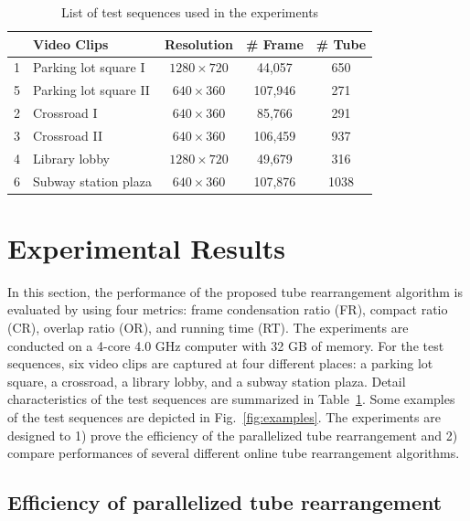 \documentclass[11pt]{hyu_thesis}
\begin{document}
\begin{table}
	\small
	\begin{center}
		\begin{tabular}{c|l|c|c|c|}
			\cline{2-5}
			& Video Clips & Resolution & \# Frame & \# Tube\\
			\hline
			\multicolumn{1}{|c|}{1} & Parking lot square I & $1280 \times 720$ & 44,057 & 650\\
			\hline
			\multicolumn{1}{|c|}{5} & Parking lot square II & $640 \times 360$ & 107,946 & 271\\
			\hline
			\multicolumn{1}{|c|}{2} & Crossroad I & $640 \times 360$ & 85,766 & 291\\
			\hline
			\multicolumn{1}{|c|}{3} & Crossroad II & $640 \times 360$ & 106,459 & 937\\
			\hline
			\multicolumn{1}{|c|}{4} & Library lobby & $1280 \times 720$ & 49,679 & 316\\
			\hline
			\multicolumn{1}{|c|}{6} & Subway station plaza & $640 \times 360$ & 107,876 & 1038\\
			\hline
		\end{tabular}
	\end{center}
	\caption{List of test sequences used in the experiments}
	\label{tb:video_list}
\end{table}
\section{Experimental Results}
\label{sec:exp}
In this section, the performance of the proposed tube rearrangement algorithm is evaluated by using four metrics: frame condensation ratio (FR), compact ratio (CR), overlap ratio (OR), and running time (RT). The experiments are conducted on a 4-core 4.0 GHz computer with 32 GB of memory. For the test sequences, six video clips are captured at four different places: a parking lot square, a crossroad, a library lobby, and a subway station plaza. Detail characteristics of the test sequences are summarized in Table~\ref{tb:video_list}. Some examples of the test sequences are depicted in Fig.~\ref{fig:examples}. The experiments are designed to 1) prove the efficiency of the parallelized tube rearrangement and 2) compare performances of several different online tube rearrangement algorithms.

\subsection{Efficiency of parallelized tube rearrangement}
\end{document}
